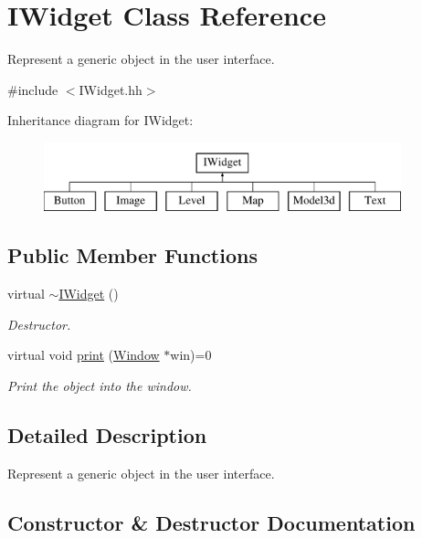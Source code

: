 \hypertarget{classIWidget}{}\section{I\+Widget Class Reference}
\label{classIWidget}


Represent a generic object in the user interface.  




{\ttfamily \#include $<$I\+Widget.\+hh$>$}

Inheritance diagram for I\+Widget\+:\begin{figure}[H]
\begin{center}
\leavevmode
\includegraphics[height=2.000000cm]{classIWidget}
\end{center}
\end{figure}
\subsection*{Public Member Functions}
\begin{DoxyCompactItemize}
\item 
virtual \hyperlink{classIWidget_ad733ed972c58c5c6268b57e2f4381666}{$\sim$\+I\+Widget} ()
\begin{DoxyCompactList}\small\item\em Destructor. \end{DoxyCompactList}\item 
virtual void \hyperlink{classIWidget_a0cfa49a402e9bb31808a715e048ab2f4}{print} (\hyperlink{classWindow}{Window} $\ast$win)=0
\begin{DoxyCompactList}\small\item\em Print the object into the window. \end{DoxyCompactList}\end{DoxyCompactItemize}


\subsection{Detailed Description}
Represent a generic object in the user interface. 

\subsection{Constructor \& Destructor Documentation}
\mbox{\label{classIWidget_ad733ed972c58c5c6268b57e2f4381666}} 
